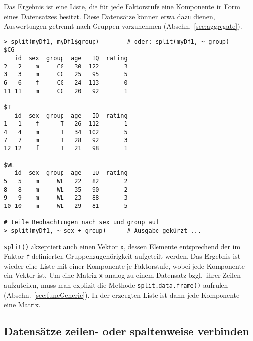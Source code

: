 Das Ergebnis ist eine Liste, die für jede Faktorstufe eine Komponente in Form eines Datensatzes besitzt. Diese Datensätze können etwa dazu dienen, Auswertungen getrennt nach Gruppen vorzunehmen (Abschn.\ \ref{sec:aggregate}).
\begin{lstlisting}
> split(myDf1, myDf1$group)        # oder: split(myDf1, ~ group)
$CG
   id  sex  group  age   IQ  rating
2   2    m     CG   30  122       3
3   3    m     CG   25   95       5
6   6    f     CG   24  113       0
11 11    m     CG   20   92       1

$T
   id  sex  group  age   IQ  rating
1   1    f      T   26  112       1
4   4    m      T   34  102       5
7   7    m      T   28   92       3
12 12    f      T   21   98       1

$WL
   id  sex  group  age   IQ  rating
5   5    m     WL   22   82       2
8   8    m     WL   35   90       2
9   9    m     WL   23   88       3
10 10    m     WL   29   81       5

# teile Beobachtungen nach sex und group auf
> split(myDf1, ~ sex + group)      # Ausgabe gekürzt ...
\end{lstlisting}

\lstinline!split()! akzeptiert auch einen Vektor \lstinline!x!, dessen Elemente entsprechend der im Faktor \lstinline!f! definierten Gruppenzugehörigkeit aufgeteilt werden. Das Ergebnis ist wieder eine Liste mit einer Komponente je Faktorstufe, wobei jede Komponente ein Vektor ist. Um eine Matrix \lstinline!x! analog zu einem Datensatz bzgl.\ ihrer Zeilen aufzuteilen, muss man explizit die Methode \lstinline!split.data.frame()! aufrufen (Abschn.\ \ref{sec:funcGeneric}). In der erzeugten Liste ist dann jede Komponente eine Matrix.

\subsection{Datensätze zeilen- oder spaltenweise verbinden}
\label{sec:dfCbind}

